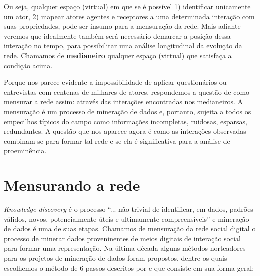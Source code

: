 Ou seja, qualquer espaço (virtual) em que se é possível 1) identificar
unicamente um ator, 2) mapear atores agentes e receptores a uma determinada
interação com suas propriedades, pode ser insumo para a mensuração da rede. Mais
adiante veremos que idealmente também será necessário demarcar a posição dessa
interação no tempo, para possibilitar uma análise longitudinal da evolução da
rede. Chamamos de \textbf{medianeiro} qualquer espaço (virtual) que satisfaça a
condição acima.

Porque nos parece evidente a impossibilidade de aplicar questionários ou
entrevistas com centenas de milhares de atores, respondemos a questão de como
mensurar a rede assim: através das interações encontradas nos medianeiros. A
mensuração é um processo de mineração de dados e, portanto, sujeita a todos os
empecilhos típicos do campo como informações incompletas, ruidosas, esparsas,
redundantes. A questão que nos aparece agora é como as interações observadas
combinam-se para formar tal rede e se ela é significativa para a análise de
proeminência.

\section{Mensurando a rede}
\label{ch:kddm}

\emph{Knowledge discovery} é o processo ``... não-trivial de identificar,
em dados, padrões válidos, novos, potencialmente úteis e ultimamente
compreensíveis'' \citep{Fayyad1996} e mineração de dados é uma de suas etapas.
Chamamos de mensuração da rede social digital o processo de minerar dados
proveninentes de meios digitais de interação social para formar uma
representação. Na última década alguns métodos norteadores para os projetos de
mineração de dados foram propostos, dentre os quais escolhemos o método de 6
passos descritos por \cite{Cios2005} e que consiste em sua forma geral:

